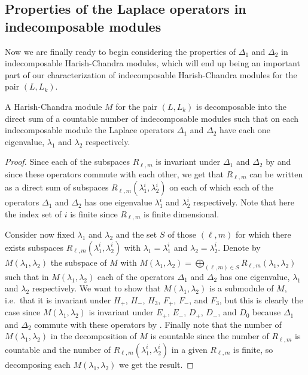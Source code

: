 \subsection{Properties of the Laplace operators in indecomposable modules}

Now we are finally ready to begin considering the properties of $\Delta_1$ and $\Delta_2$ in indecomposable Harish-Chandra modules, which will end up being an important part of our characterization of indecomposable Harish-Chandra modules for the pair $(L,L_k)$.

\begin{proposition}
  A Harish-Chandra module $M$ for the pair $(L,L_k)$ is decomposable into the direct sum of a countable number of indecomposable modules such that on each indecomposable module the Laplace operators $\Delta_1$ and $\Delta_2$ have each one eigenvalue, $\lambda_1$ and $\lambda_2$ respectively.
\end{proposition}
\begin{proof}
  Since each of the subspaces $R_{\ell,m}$ is invariant under $\Delta_1$ and $\Delta_2$ by  and since these operators commute with each other, we get that $R_{\ell,m}$ can be written as a direct sum of subspaces $R_{\ell,m}(\lambda_1^{i},\lambda_2^{i})$ on each of which each of the operators $\Delta_1$ and $\Delta_2$ has one eigenvalue $\lambda_1^{i}$ and $\lambda_2^{i}$ respectively. Note that here the index set of $i$ is finite since $R_{\ell,m}$ is finite dimensional.

  Consider now fixed $\lambda_1$ and $\lambda_2$ and the set $S$ of those $(\ell,m)$ for which there exists subspaces $R_{\ell,m}(\lambda_1^{i},\lambda_2^{i})$ with $\lambda_1=\lambda_1^{i}$ and $\lambda_2=\lambda_2^{i}$. Denote by $M(\lambda_1,\lambda_2)$ the subspace of $M$ with $M(\lambda_1,\lambda_2)=\bigoplus_{(\ell,m)\in S} R_{\ell,m}(\lambda_1,\lambda_2)$ such that in $M(\lambda_1,\lambda_2)$ each of the operators $\Delta_1$ and $\Delta_2$ has one eigenvalue, $\lambda_1$ and $\lambda_2$ respectively. We want to show that $M(\lambda_1,\lambda_2)$ is a submodule of $M$, i.e.\ that it is invariant under $H_+$, $H_-$, $H_3$, $F_+$, $F_-$, and $F_3$, but this is clearly the case since $M(\lambda_1,\lambda_2)$ is invariant under $E_+$, $E_-$, $D_+$, $D_-$, and $D_0$ because $\Delta_1$ and $\Delta_2$ commute with these operators by . Finally note that the number of $M(\lambda_1,\lambda_2)$ in the decomposition of $M$ is countable since the number of $R_{\ell,m}$ is countable and the number of $R_{\ell,m}(\lambda_1^{i},\lambda_2^{i})$ in a given $R_{\ell,m}$ is finite, so decomposing each $M(\lambda_1,\lambda_2)$ we get the result.
\end{proof}

